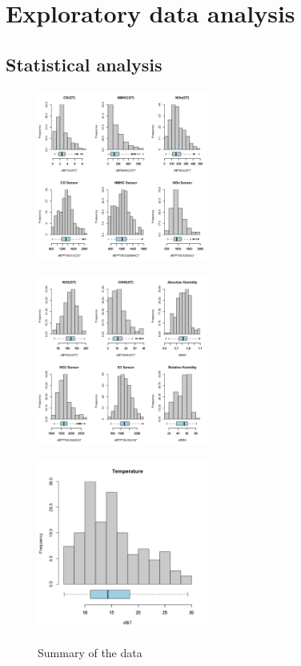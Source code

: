 \section{Exploratory data analysis}

\subsection{Statistical analysis}


\begin{figure}[H]
  \centering
  \includegraphics[width=0.5\textwidth]{figs/summary_1.png}
\end{figure}

\begin{figure}[H]
  \centering
  \includegraphics[width=0.5\textwidth]{figs/summary_2.png}
\end{figure}

\begin{figure}[H]
  \centering
  \includegraphics[width=0.5\textwidth]{figs/summary_3.png}
  \label{fig:summary}
  \caption{Summary of the data}
\end{figure}


